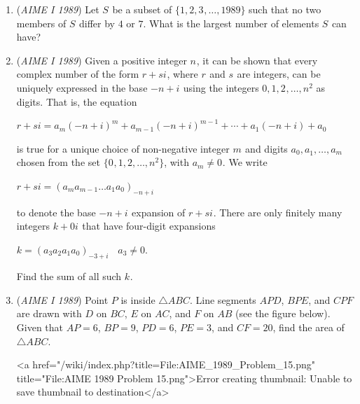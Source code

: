 \begin{enumerate}
 <a href="/wiki/index.php?title=File:AIME\_1989\_Problem\_12.png" title="File:AIME 1989 Problem 12.png">Error creating thumbnail: Unable to save thumbnail to destination</a>

	\item (\textit{AIME I 1989}) Let $S^{}_{}$ be a subset of $\{1,2,3^{}_{},\ldots,1989\}$ such that no two members of $S^{}_{}$ differ by $4$ or $7$. What is the largest number of elements $S^{}_{}$ can have?


 

	\item (\textit{AIME I 1989}) Given a positive integer $n^{}_{}$, it can be shown that every complex number of the form $r+si^{}_{}$, where $r^{}_{}$ and $s^{}_{}$ are integers, can be uniquely expressed in the base $-n+i^{}_{}$ using the integers $0,1,2^{}_{},\ldots,n^2$ as digits. That is, the equation


 $r+si=a_m(-n+i)^m+a_{m-1}(-n+i)^{m-1}+\cdots +a_1(-n+i)+a_0$

 is true for a unique choice of non-negative integer $m^{}_{}$ and digits $a_0,a_1^{},\ldots,a_m$ chosen from the set $\{0^{}_{},1,2,\ldots,n^2\}$, with $a_m\ne 0^{}{}$. We write


 $r+si=(a_ma_{m-1}\ldots a_1a_0)_{-n+i}$

 to denote the base $-n+i^{}_{}$ expansion of $r+si^{}_{}$. There are only finitely many integers $k+0i^{}_{}$ that have four-digit expansions


 $k=(a_3a_2a_1a_0)_{-3+i^{}_{}}~~~~a_3\ne 0.$

 Find the sum of all such $k^{}_{}$.


 

	\item (\textit{AIME I 1989}) Point $P$ is inside $\triangle ABC$. Line segments $APD$, $BPE$, and $CPF$ are drawn with $D$ on $BC$, $E$ on $AC$, and $F$ on $AB$ (see the figure below). Given that $AP=6$, $BP=9$, $PD=6$, $PE=3$, and $CF=20$, find the area of $\triangle ABC$.


 <a href="/wiki/index.php?title=File:AIME\_1989\_Problem\_15.png" title="File:AIME 1989 Problem 15.png">Error creating thumbnail: Unable to save thumbnail to destination</a>

\end{enumerate}